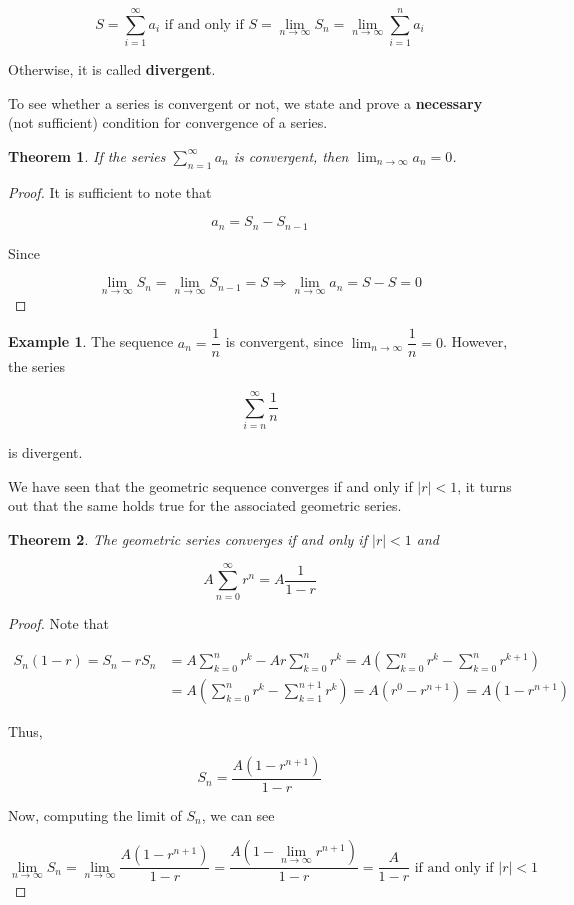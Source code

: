 \documentclass[a4paper,11pt]{article}
\theoremstyle{definition}
\newtheorem{example}{Example}
\theoremstyle{plain}
\newtheorem{theorem}{Theorem}
\begin{document}
\[
S = \sum^{\infty}_{i=1} a_i \text{ if and only if } S = \lim_{n\rightarrow\infty} S_n = \lim_{n\rightarrow\infty}\sum^n_{i=1} a_i
\]

Otherwise, it is called \textbf{divergent}.

To see whether a series is convergent or not, we state and prove a \textbf{necessary} (not sufficient) condition for convergence of a series.

\begin{theorem}
If the series \(\sum^{\infty}_{n=1} a_n\) is convergent, then \(\lim_{n\rightarrow\infty}a_n = 0\).
\end{theorem}

\begin{proof}
It is sufficient to note that

\[
a_n = S_{n} - S_{n-1}
\]

Since

\[
\lim_{n\rightarrow\infty}S_{n} = \lim_{n\rightarrow\infty}S_{n-1} = S \Rightarrow \lim_{n\rightarrow\infty}a_{n} = S - S = 0
\]
\end{proof}

\begin{example}
The sequence \(a_n = \dfrac{1}{n}\) is convergent, since \(\lim_{n\rightarrow\infty} \dfrac{1}{n} = 0\). However, the
series

\[
\sum^{\infty}_{i=n} \frac{1}{n}
\]

is divergent.
\end{example}

We have seen that the geometric sequence converges if and only if \(\lvert r \rvert <1\), it turns out that the same holds true for the associated geometric series.


\begin{theorem}
The \emph{geometric series} converges if and only if \(\lvert r\rvert < 1\) and

\[
A\sum^{\infty}_{n=0} r^n = A\frac{1}{1-r}
\]
\end{theorem}

\begin{proof}
Note that

\begin{align*}
S_n(1-r) = S_n - rS_n &= A\sum^n_{k=0}r^k - Ar\sum^{n}_{k=0} r^k = A\left(\sum^n_{k=0} r^k - \sum^n_{k=0} r^{k+1}\right) \\
&= A\left(\sum_{k=0}^n r^k - \sum^{n+1}_{k=1} r^k\right) =A\left( r^0 - r^{n+1}\right) = A\left(1-r^{n+1}\right)
\end{align*}

Thus,

\[
S_n = \frac{A\left(1-r^{n+1}\right)}{1-r}
\]

Now, computing the limit of \(S_n\), we can see

\[
\lim_{n\rightarrow\infty} S_n = \lim_{n\rightarrow\infty} \frac{A\left(1-r^{n+1}\right)}{1-r} = \frac{A\left(1 -  \displaystyle\lim_{n\rightarrow\infty} r^{n+1}\right)}{1-r} =  \frac{A}{1-r} \text{ if and only if }\lvert r \rvert < 1
\]
\end{proof}
\end{document}
